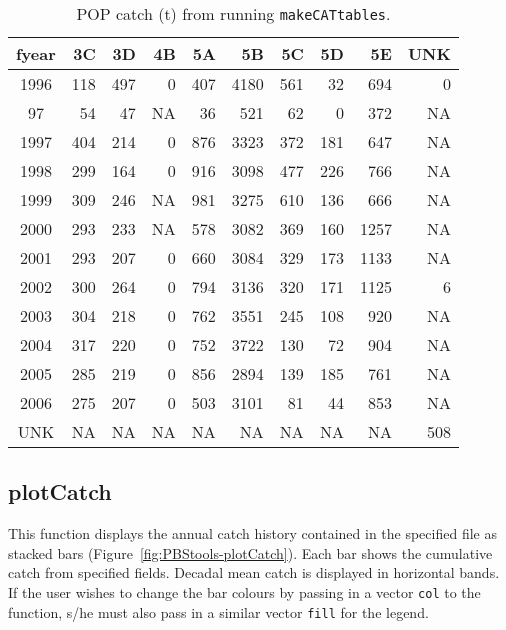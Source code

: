 \documentclass[letterpaper,12pt,fleqn]{article}
\def\tab{\hspace{0.5 in}}
\newcommand\tstrut{\rule{0pt}{2.4ex}}         %
\newcommand\bstrut{\rule[-1.0ex]{0pt}{0pt}}   %
\newcommand{\code}[1]{\small\texttt{#1}\normalsize}
\begin{document}
\begin{table}[ht!]
  \caption{POP catch (t) from running \code{makeCATtables}.}
  \begin{center}
    \begin{tabular}{crrrrrrrrr}
    \hline 
    fyear & 3C & 3D & 4B & 5A & 5B & 5C & 5D & 5E & UNK  \tstrut \bstrut \\
    \hline
    1996 & 118 & 497 & 0  & 407 & 4180 & 561 &  32 &  694 & 0 \tstrut \\ 
      97 &  54 &  47 & NA &  36 & 521  &  62 &   0 &  372 & NA \\ 
    1997 & 404 & 214 & 0  & 876 & 3323 & 372 & 181 &  647 & NA \\ 
    1998 & 299 & 164 & 0  & 916 & 3098 & 477 & 226 &  766 & NA \\ 
    1999 & 309 & 246 & NA & 981 & 3275 & 610 & 136 &  666 & NA \\ 
    2000 & 293 & 233 & NA & 578 & 3082 & 369 & 160 & 1257 & NA \\ 
    2001 & 293 & 207 & 0  & 660 & 3084 & 329 & 173 & 1133 & NA \\ 
    2002 & 300 & 264 & 0  & 794 & 3136 & 320 & 171 & 1125 & 6 \\ 
    2003 & 304 & 218 & 0  & 762 & 3551 & 245 & 108 &  920 & NA \\ 
    2004 & 317 & 220 & 0  & 752 & 3722 & 130 &  72 &  904 & NA \\ 
    2005 & 285 & 219 & 0  & 856 & 2894 & 139 & 185 &  761 & NA \\ 
    2006 & 275 & 207 & 0  & 503 & 3101 &  81 &  44 &  853 & NA \\ 
    UNK  & NA  & NA  & NA & NA  & NA   &  NA & NA  & NA  & 508 \bstrut \\ 
    \hline 
    \end{tabular}
  \end{center}
  \label{tab:PBStools-makePOPtables}
\end{table}

\subsection {plotCatch}

\tab This function displays the annual catch history contained in the specified file as stacked bars (Figure~\ref{fig:PBStools-plotCatch}). Each bar shows the cumulative catch from specified fields. Decadal mean catch is displayed in horizontal bands. If the user wishes to change the bar colours by passing in a vector \code{col} to the function, s/he must also pass in a similar vector \code{fill} for the legend.
\end{document}
